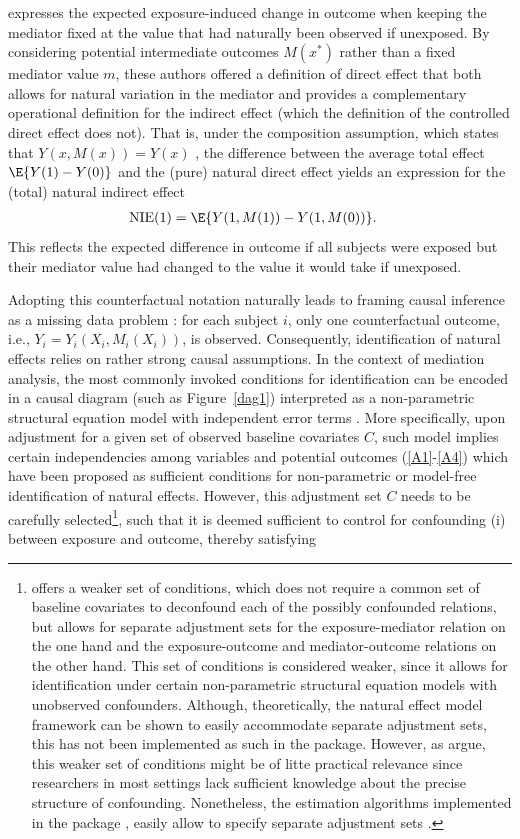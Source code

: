 \documentclass[nojss]{jss}
\begin{document}
expresses the expected exposure-induced change in outcome when keeping the mediator fixed at the value that had naturally been observed if unexposed. By considering potential intermediate outcomes $M(x^*)$ rather than a fixed mediator value $m$, these authors offered a definition of direct effect that both allows for natural variation in the mediator and provides a complementary operational definition for the indirect effect (which the definition of the controlled direct effect does not). That is, under the composition assumption, which states that $Y(x,M(x)) = Y(x)$ \citep{VanderWeele2009b}, the difference between the average total effect $\E\{Y(1) - Y(0)\}$ and the (pure) natural direct effect yields an expression for the (total) natural indirect effect
\begin{align*}
\mbox{NIE}(1) &= \E\{Y(1,M(1)) - Y(1,M(0))\}.
\end{align*}
This reflects the expected difference in outcome if all subjects were exposed but their mediator value had changed to the value it would take if unexposed.
\par Adopting this counterfactual notation naturally leads to framing causal inference as a missing data problem \citep{Holland1986}: for each subject $i$, only one counterfactual outcome, i.e., $Y_i = Y_i(X_i,M_i(X_i))$, is observed. Consequently, identification of natural effects relies on rather strong causal assumptions. In the context of mediation analysis, the most commonly invoked conditions for identification can be encoded in a causal diagram (such as Figure~\ref{dag1}) interpreted as a non-parametric structural equation model with independent error terms \citep[NPSEM-IE;][]{Pearl2001}. More specifically, upon adjustment for a given set of observed baseline covariates $C$, such model implies certain independencies among variables and potential outcomes (\ref{A1}-\ref{A4}) which have been proposed as sufficient conditions for non-parametric or model-free identification of natural effects. However, this adjustment set $C$ needs to be carefully selected\footnote{\cite{Pearl2001,Pearl2014} offers a weaker set of conditions, which does not require a common set of baseline covariates to deconfound each of the possibly confounded relations, but allows for separate adjustment sets for the exposure-mediator relation on the one hand and the exposure-outcome and mediator-outcome relations on the other hand. This set of conditions is considered weaker, since it allows for identification under certain non-parametric structural equation models with unobserved confounders. Although, theoretically, the natural effect model framework can be shown to easily accommodate separate adjustment sets, this has not been implemented as such in the  package. However, as \cite{Imai2014} argue, this weaker set of conditions might be of litte practical relevance since researchers in most settings lack sufficient knowledge about the precise structure of confounding. Nonetheless, the estimation algorithms implemented in the  package \citep{R:mediation}, easily allow to specify separate adjustment sets \citep{Imai2014}.}, such that it is deemed sufficient to control for confounding (i) between exposure and outcome, thereby satisfying
\end{document}
